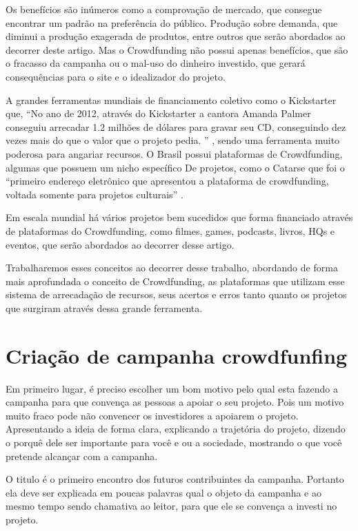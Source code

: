 \documentclass{classe_cn}                 %
\begin{document}
Os benefícios são inúmeros como a comprovação de mercado, que consegue encontrar um padrão na preferência do público. Produção sobre demanda, que diminui a produção exagerada de produtos, entre outros que serão abordados ao decorrer deste artigo. Mas o Crowdfunding não possui apenas benefícios, que são o fracasso da campanha ou o mal-uso do dinheiro investido, que gerará consequências para o site e o idealizador do projeto.

A grandes ferramentas mundiais de financiamento coletivo como o Kickstarter que, “No ano de 2012, através do Kickstarter a cantora Amanda Palmer conseguiu arrecadar 1.2 milhões de dólares para gravar seu CD, conseguindo dez vezes mais do que o valor que o projeto pedia. ” \cite[p. 9]{CAVALCANTI:2013}, sendo uma ferramenta muito poderosa para angariar recursos. O Brasil possui plataformas de Crowdfunding, algumas que possuem um nicho específico De projetos, como o Catarse que foi o “primeiro endereço eletrônico que apresentou a plataforma de crowdfunding, voltada somente para projetos culturais” \cite{COCATE:2012}.

Em escala mundial há vários projetos bem sucedidos que forma financiado através de plataformas do Crowdfunding, como filmes, games, podcasts, livros, HQs e eventos, que serão abordados ao decorrer desse artigo.

Trabalharemos esses conceitos ao decorrer desse trabalho, abordando de forma mais aprofundada o conceito de Crowdfunding, as plataformas que utilizam esse sistema de arrecadação de recursos, seus acertos e erros tanto quanto os projetos que surgiram através dessa grande ferramenta.

\section{Criação de campanha crowdfunfing}

Em primeiro lugar, é preciso escolher um bom motivo pelo qual esta fazendo a campanha para que convença as pessoas a apoiar o seu projeto. Pois um motivo muito fraco pode não convencer os investidores a apoiarem o projeto. Apresentando a ideia de forma clara, explicando a trajetória do projeto, dizendo o porquê dele ser importante para você e ou a sociedade, mostrando o que você pretende alcançar com a campanha.

O titulo é o primeiro encontro dos futuros contribuintes da campanha. Portanto ela deve ser explicada em poucas palavras qual o objeto da campanha e ao mesmo tempo sendo chamativa ao leitor, para que ele se convença a investi no projeto.
\end{document}
